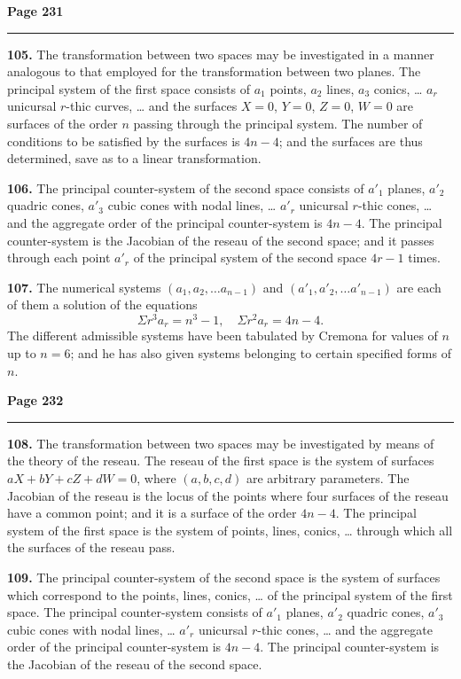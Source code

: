 \documentclass[12pt,a4paper]{article}
\theoremstyle{plain}
\theoremstyle{definition}
\theoremstyle{remark}
\begin{document}
\newpage
\noindent\textbf{Page 231}\\
\noindent\rule{\textwidth}{0.4pt}

\smallskip

\noindent\textbf{105.} The transformation between two spaces may be investigated in a manner analogous to that employed for the transformation between two planes. The principal system of the first space consists of $a_1$ points, $a_2$ lines, $a_3$ conics, \ldots{} $a_r$ unicursal $r$-thic curves, \ldots{} and the surfaces $X = 0$, $Y = 0$, $Z = 0$, $W = 0$ are surfaces of the order $n$ passing through the principal system. The number of conditions to be satisfied by the surfaces is $4n - 4$; and the surfaces are thus determined, save as to a linear transformation.

\textbf{106.} The principal counter-system of the second space consists of $a'_1$ planes, $a'_2$ quadric cones, $a'_3$ cubic cones with nodal lines, \ldots{} $a'_r$ unicursal $r$-thic cones, \ldots{} and the aggregate order of the principal counter-system is $4n - 4$. The principal counter-system is the Jacobian of the reseau of the second space; and it passes through each point $a'_r$ of the principal system of the second space $4r - 1$ times.

\textbf{107.} The numerical systems $(a_1, a_2, \ldots a_{n-1})$ and $(a'_1, a'_2, \ldots a'_{n-1})$ are each of them a solution of the equations
\[
\Sigma r^3 a_r = n^3 - 1, \quad \Sigma r^2 a_r = 4n - 4.
\]
The different admissible systems have been tabulated by Cremona for values of $n$ up to $n = 6$; and he has also given systems belonging to certain specified forms of $n$.

\newpage
\noindent\textbf{Page 232}\\
\noindent\rule{\textwidth}{0.4pt}

\smallskip

\noindent\textbf{108.} The transformation between two spaces may be investigated by means of the theory of the reseau. The reseau of the first space is the system of surfaces $aX + bY + cZ + dW = 0$, where $(a, b, c, d)$ are arbitrary parameters. The Jacobian of the reseau is the locus of the points where four surfaces of the reseau have a common point; and it is a surface of the order $4n - 4$. The principal system of the first space is the system of points, lines, conics, \ldots{} through which all the surfaces of the reseau pass.

\textbf{109.} The principal counter-system of the second space is the system of surfaces which correspond to the points, lines, conics, \ldots{} of the principal system of the first space. The principal counter-system consists of $a'_1$ planes, $a'_2$ quadric cones, $a'_3$ cubic cones with nodal lines, \ldots{} $a'_r$ unicursal $r$-thic cones, \ldots{} and the aggregate order of the principal counter-system is $4n - 4$. The principal counter-system is the Jacobian of the reseau of the second space.
\end{document}
